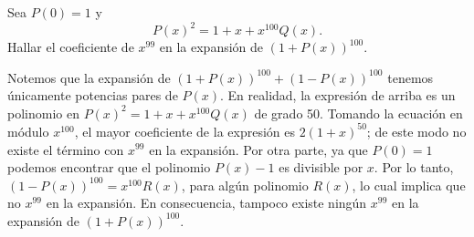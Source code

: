 \begin{example}
    Sea $P(0) = 1$ y
    \[
        P(x)^2 = 1 + x + x^{100} Q(x).
    \]
    Hallar el coeficiente de $x^{99}$ en la expansión de $\left(1 + P(x)\right)^{100}$.
\end{example}
\begin{solution}
    Notemos que la expansión de $\left(1 + P(x)\right)^{100} + \left(1 - P(x)\right)^{100}$ tenemos únicamente potencias pares de $P(x)$.
    En realidad, la expresión de arriba es un polinomio en $P(x)^2 = 1 + x + x^{100} Q(x)$ de grado 50.
    Tomando la ecuación en módulo $x^{100}$, el mayor coeficiente de la expresión es $2(1 + x)^{50}$; de este modo no existe el término con $x^{99}$ en la expansión.
    Por otra parte, ya que $P(0) = 1$ podemos encontrar que el polinomio $P(x) - 1$ es divisible por $x$.
    Por lo tanto, $\left(1 - P(x)\right)^{100} = x^{100} R(x)$, para algún polinomio $R(x)$, lo cual implica que no $x^{99}$ en la expansión.
    En consecuencia, tampoco existe ningún $x^{99}$ en la expansión de $\left(1 + P(x)\right)^{100}$.
\end{solution}

